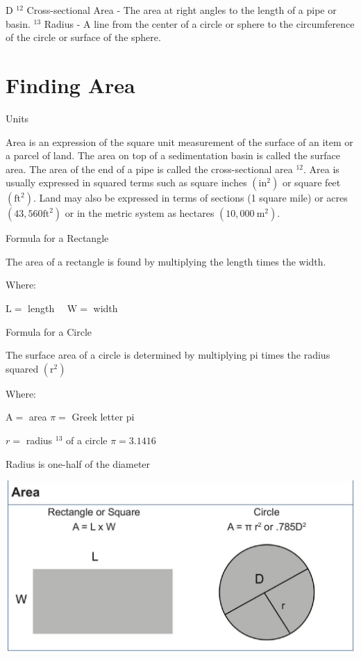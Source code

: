 \documentclass[10pt]{article}
\begin{document}
D ${ }^{12}$ Cross-sectional Area - The area at right angles to the length of a pipe or basin. ${ }^{13}$ Radius - A line from the center of a circle or sphere to the circumference of the circle or surface of the sphere.

\section{Finding Area}
Units

Area is an expression of the square unit measurement of the surface of an item or a parcel of land. The area on top of a sedimentation basin is called the surface area. The area of the end of a pipe is called the cross-sectional area ${ }^{12}$. Area is usually expressed in squared terms such as square inches $\left(\mathrm{in}^{2}\right)$ or square feet $\left(\mathrm{ft}^{2}\right)$. Land may also be expressed in terms of sections (1 square mile) or acres $\left(43,560 \mathrm{ft}^{2}\right)$ or in the metric system as hectares $\left(10,000 \mathrm{~m}^{2}\right)$.

Formula for a Rectangle

The area of a rectangle is found by multiplying the length times the width.

Where:

$\mathrm{L}=$ length $\quad \mathrm{W}=$ width

Formula for a Circle

The surface area of a circle is determined by multiplying pi times the radius squared $\left(\mathrm{r}^{2}\right)$

Where:

$\mathrm{A}=$ area $\pi=$ Greek letter pi

$r=$ radius $^{13}$ of a circle $\pi=3.1416$

Radius is one-half of the diameter

\includegraphics[max width=\textwidth]{2022_09_11_72dbedc910e6e984560cg-27}
\end{document}
